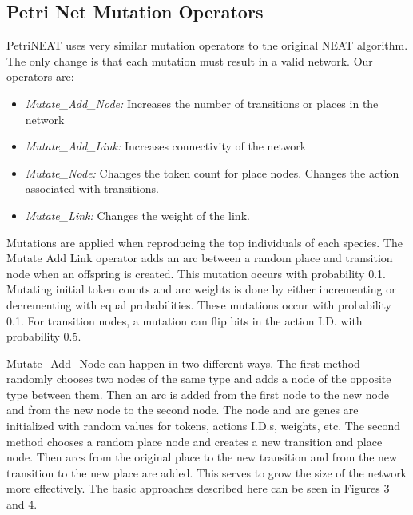 \documentclass[12pt,a4paper,twocolumn]{article}
\begin{document}
\subsection{Petri Net Mutation Operators}
\label{subsec:mutationOperators}
PetriNEAT uses very similar mutation operators to the original NEAT algorithm. The only change is that each mutation must result in a valid network. Our operators are:
\begin{itemize}
\item \emph{Mutate{\_}Add{\_}Node:} Increases the number of transitions or places in the network
\item \emph{Mutate{\_}Add{\_}Link:}  Increases connectivity of the network
\item \emph{Mutate{\_}Node:}  Changes the token count for place nodes. Changes the action associated with transitions.
\item \emph{Mutate{\_}Link:} Changes the weight of the link.
\end{itemize}

Mutations are applied when reproducing the top individuals of each species. The Mutate Add Link operator adds an arc between a random place and transition node when an offspring is created. This mutation occurs with probability 0.1. Mutating initial token counts and arc weights is done by either incrementing or decrementing with equal probabilities. These mutations occur with probability 0.1. For transition nodes, a mutation can flip bits in the action I.D. with probability 0.5. 

Mutate{\_}Add{\_}Node can happen in two different ways. The first method randomly chooses two nodes of the same type and adds a node of the opposite type between them. Then an arc is added from the first node to the new node and from the new node to the second node. The node and arc genes are initialized with random values for tokens, actions I.D.s, weights, etc. The second method chooses a random place node and creates a new transition and place node. Then arcs from the original place to the new transition and from the new transition to the new place are added. This serves to grow the size of the network more effectively. The basic approaches described here can be seen in Figures 3 and 4.
\end{document}
